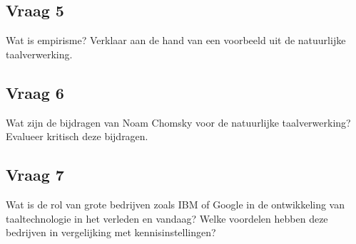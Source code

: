 \documentclass[../main.tex]{subfiles}
\begin{document}
\begin{solution}

\end{solution}

\subsection{Vraag 5}
\begin{question}
Wat is empirisme? Verklaar aan de hand van een voorbeeld uit de natuurlijke taalverwerking.
\end{question}

\begin{solution}

\end{solution}

\subsection{Vraag 6}
\begin{question}
Wat zijn de bijdragen van Noam Chomsky voor de natuurlijke taalverwerking? Evalueer kritisch deze bijdragen.
\end{question}

\begin{solution}

\end{solution}


\subsection{Vraag 7}
\begin{question}
Wat is de rol van grote bedrijven zoals IBM of Google in de ontwikkeling van taaltechnologie in het verleden en vandaag? Welke voordelen hebben deze bedrijven in vergelijking met kennisinstellingen?
\end{question}

\begin{solution}

\end{solution}
\end{document}

